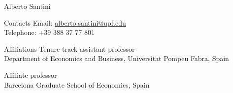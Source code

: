 \documentclass[12pt]{article}
\newcommand{\cvImportant}[1]{\textcolor{cvblue}{#1}}
\begin{document}
  

  {\huge\TitleFont Alberto Santini}

  \vspace{2em}

  \begin{paracol}{2}
    {\TitleFont Contacts}
  \switchcolumn
    Email: \href{mailto:alberto.santini@upf.edu}{alberto.santini@upf.edu}\\
    Telephone: +39 388 37 77 801
  \end{paracol}

  \vspace{0.5em}

  \begin{paracol}{2}
    {\TitleFont Affiliations}
  \switchcolumn
    \cvImportant{Tenure-track assistant professor}\\
    Department of Economics and Business, Universitat Pompeu Fabra, Spain

    \cvImportant{Affiliate professor}\\
    Barcelona Graduate School of Economics, Spain
  \end{paracol}

  
  
  
  
  
  
  
  
  
\end{document}

